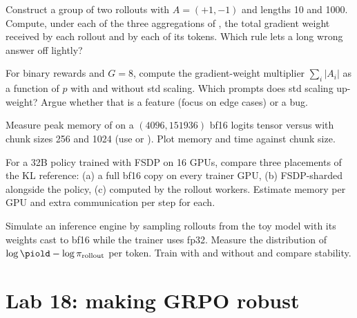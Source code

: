 \begin{exercise}
Construct a group of two rollouts with $A=(+1,-1)$ and lengths 10 and 1000. Compute, under
each of the three aggregations of , the total gradient weight
received by each rollout and by each of its tokens. Which rule lets a long wrong answer off
lightly?
\end{exercise}

\begin{exercise}
For binary rewards and $G=8$, compute the gradient-weight multiplier
$\sum_i|A_i|$ as a function of $p$ with and without std scaling. Which prompts does std
scaling up-weight? Argue whether that is a feature (focus on edge cases) or a bug.
\end{exercise}

\begin{exercise}
Measure peak memory of  on a $(4096, \num{151936})$ bf16 logits tensor
versus  with chunk sizes 256 and 1024 (use
\allowbreak{} or ). Plot memory and time against
chunk size.
\end{exercise}

\begin{exercise}
For a 32B policy trained with FSDP on 16 GPUs, compare three placements of the KL
reference: (a) a full bf16 copy on every trainer GPU, (b) FSDP-sharded alongside the policy,
(c) computed by the rollout workers. Estimate memory per GPU and extra communication per step
for each.
\end{exercise}

\begin{exercise}
Simulate an inference engine by sampling rollouts from the toy model with its weights cast to
bf16 while the trainer uses fp32. Measure the distribution of $\log\piold-\log\pi_{\text{rollout}}$
per token. Train with and without  and compare stability.
\end{exercise}

\section{Lab 18: making GRPO robust}\label{sec:grpo2:lab}

